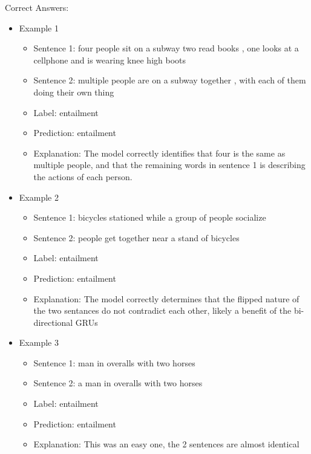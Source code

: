 \documentclass[a4paper,10pt]{article}
\begin{document}
\par
\justify
Correct Answers:
\begin{itemize}
\item Example 1
	\begin{itemize}
	\item Sentence 1: four people sit on a subway two read books , one looks at a cellphone and is wearing knee high boots
	\item Sentence 2: multiple people are on a subway together , with each of them doing their own thing
	\item Label: entailment
	\item Prediction: entailment
	\item Explanation: The model correctly identifies that four is the same as multiple people, and that the remaining words in sentence 1 is describing the actions of each person.
	\end{itemize}
\end{itemize}

\begin{itemize}
\item Example 2
	\begin{itemize}
	\item Sentence 1: bicycles stationed while a group of people socialize
	\item Sentence 2: people get together near a stand of bicycles
	\item Label: entailment
	\item Prediction: entailment
	\item Explanation: The model correctly determines that the flipped nature of the two sentances do not contradict each other, likely a benefit of the bi-directional GRUs
	\end{itemize}
\end{itemize}

\begin{itemize}
\item Example 3
	\begin{itemize}
	\item Sentence 1: man in overalls with two horses
	\item Sentence 2: a man in overalls with two horses
	\item Label: entailment
	\item Prediction: entailment
	\item Explanation: This was an easy one, the 2 sentences are almost identical
	\end{itemize}
\end{itemize}
\end{document}
